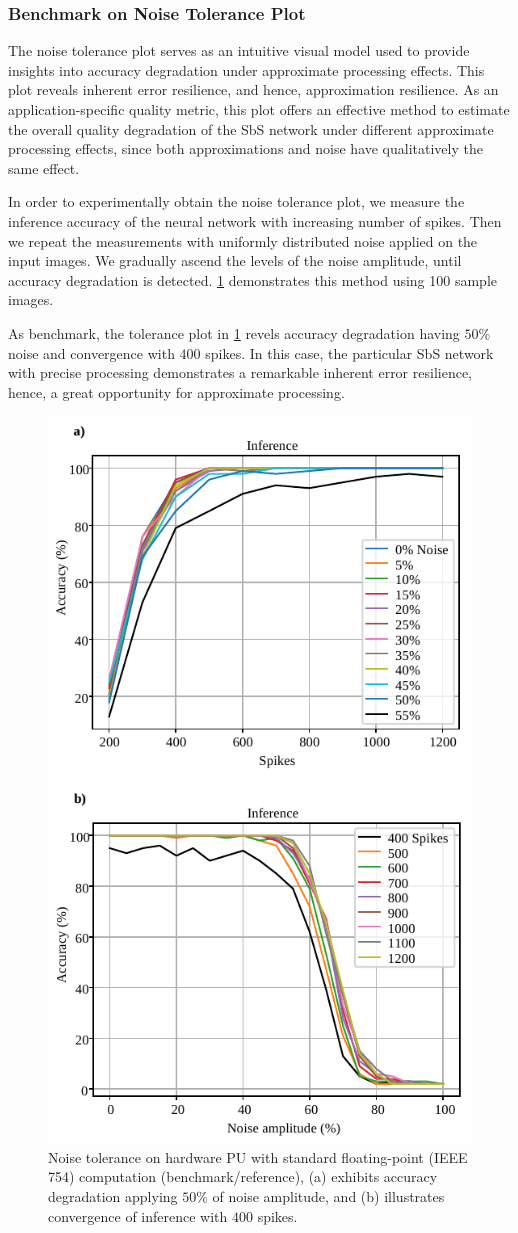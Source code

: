\subsubsection{Benchmark on Noise Tolerance Plot}
The noise tolerance plot serves as an intuitive visual model used to provide insights into accuracy degradation under approximate processing effects. This plot reveals inherent error resilience, and hence, approximation resilience. As an application-specific quality metric, this plot offers an effective method to estimate the overall quality degradation of the SbS network under different approximate processing effects, since both approximations and noise have qualitatively the same effect\cite{venkataramani2015approximate}.

In order to experimentally obtain the noise tolerance plot, we measure the inference accuracy of the neural network with increasing number of spikes. Then we repeat the measurements with uniformly distributed noise applied on the input images. We gradually ascend the levels of the noise amplitude, until accuracy degradation is detected. \ref{fig:accuracy_vs_noise_pu_fp} demonstrates this method using 100 sample images.

As benchmark, the tolerance plot in \ref{fig:accuracy_vs_noise_pu_fp} revels accuracy degradation having $50\%$ noise and convergence with $400$ spikes. In this case, the particular SbS network with precise processing demonstrates a remarkable inherent error resilience, hence, a great opportunity for approximate processing.


\begin{figure}[b!]
	\centering
	\includegraphics[width=0.5\columnwidth]{./chapters/sbs_accelerator/figures/accuracy_vs_noise_pu_fp.pdf}
	\caption{Noise tolerance on hardware PU with standard floating-point (IEEE 754) computation (benchmark/reference), (a) exhibits accuracy degradation applying $50\%$ of noise amplitude, and (b) illustrates convergence of inference with $400$ spikes.}
	\label{fig:accuracy_vs_noise_pu_fp}
\end{figure}


